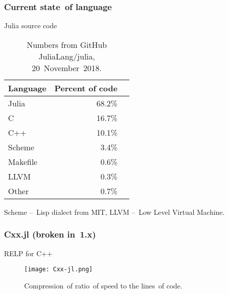 \documentclass{beamer}  %
\begin{document}
\begin{frame}
  \frametitle{Current state~of language}

  \begin{block}{Julia source code}
    \begin{table}
      \centering
      
      \begin{tabular}{|l|r|r|}
        \hline
        Language & Percent of code \\
        \hline
        Julia & 68.2\% \\
        \hline
        C & 16.7\% \\
        \hline
        C++ & 10.1\% \\
        \hline
        Scheme & 3.4\% \\
        \hline
        Makefile & 0.6\% \\
        \hline
        LLVM & 0.3\% \\
        \hline
        Other & 0.7\% \\
        \hline
      \end{tabular}
      \caption{Numbers from GitHub JuliaLang/julia, 20~November~2018.}
    \end{table}
  \end{block}

  \begin{block}{}
    Scheme --~Lisp dialect from MIT, LLVM --~Low Level Virtual Machine.
  \end{block}
  
\end{frame}





\begin{frame}
  \frametitle{Cxx.jl (broken in~1.x)}

  \begin{block}{RELP for C++}
    \begin{figure}
      \centering

      \texttt{[image: Cxx-jl.png]}
      \caption{Compression~of ratio~of speed to the lines~of code.}
    \end{figure}
  \end{block}

\end{frame}
\end{document}
